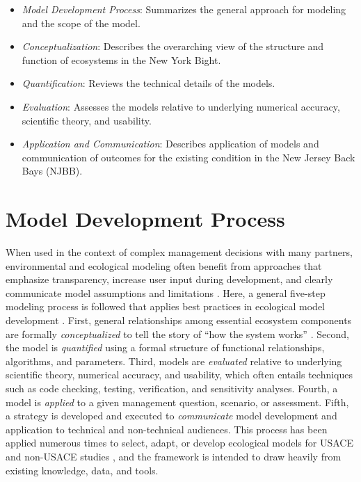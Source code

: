 \documentclass[
]{book}
\begin{document}
\begin{itemize}
\item
  \emph{Model Development Process}: Summarizes the general approach for modeling and the scope of the model.
\item
  \emph{Conceptualization}: Describes the overarching view of the structure and function of ecosystems in the New York Bight.
\item
  \emph{Quantification}: Reviews the technical details of the models.
\item
  \emph{Evaluation}: Assesses the models relative to underlying numerical accuracy, scientific theory, and usability.
\item
  \emph{Application and Communication}: Describes application of models and communication of outcomes for the existing condition in the New Jersey Back Bays (NJBB).
\end{itemize}

\hypertarget{model-development-process}{%
\chapter{Model Development Process}\label{model-development-process}}

When used in the context of complex management decisions with many partners, environmental and ecological modeling often benefit from approaches that emphasize transparency, increase user input during development, and clearly communicate model assumptions and limitations \citep{van_den_belt_mediated_2004, voinov_modelling_2010, herman_unpacking_2019}. Here, a general five-step modeling process is followed that applies best practices in ecological model development \citep{grant_ecological_2008}. First, general relationships among essential ecosystem components are formally \emph{conceptualized} to tell the story of ``how the system works'' \citep{fischenich_application_2008}. Second, the model is \emph{quantified} using a formal structure of functional relationships, algorithms, and parameters. Third, models are \emph{evaluated} relative to underlying scientific theory, numerical accuracy, and usability, which often entails techniques such as code checking, testing, verification, and sensitivity analyses. Fourth, a model is \emph{applied} to a given management question, scenario, or assessment. Fifth, a strategy is developed and executed to \emph{communicate} model development and application to technical and non-technical audiences. This process has been applied numerous times to select, adapt, or develop ecological models for USACE and non-USACE studies \citep[e.g.,][]{mckay_aligning_2019, herman_unpacking_2019}, and the framework is intended to draw heavily from existing knowledge, data, and tools.
\end{document}
